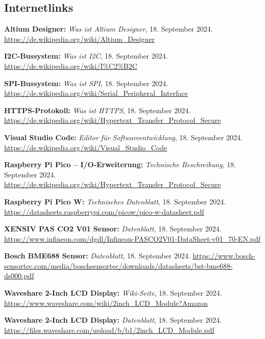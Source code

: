 \begin{thebibliography}{9999}

\section*{Internetlinks}

\textbf{Altium Designer:} \textit{Was ist Altium Designer}, 18. September 2024.  
\url{https://de.wikipedia.org/wiki/Altium_Designer}

\textbf{I2C-Bussystem:} \textit{Was ist I2C}, 18. September 2024.  
\url{https://de.wikipedia.org/wiki/I%C2%B2C}

\textbf{SPI-Bussystem:} \textit{Was ist SPI}, 18. September 2024.  
\url{https://de.wikipedia.org/wiki/Serial_Peripheral_Interface}

\textbf{HTTPS-Protokoll:} \textit{Was ist HTTPS}, 18. September 2024.  
\url{https://de.wikipedia.org/wiki/Hypertext_Transfer_Protocol_Secure}

\textbf{Visual Studio Code:} \textit{Editor für Softwareentwicklung}, 18. September 2024.  
\url{https://de.wikipedia.org/wiki/Visual_Studio_Code}

\textbf{Raspberry Pi Pico – I/O-Erweiterung:} \textit{Technische Beschreibung}, 18. September 2024.  
\url{https://de.wikipedia.org/wiki/Hypertext_Transfer_Protocol_Secure}

\textbf{Raspberry Pi Pico W:} \textit{Technisches Datenblatt}, 18. September 2024.  
\url{https://datasheets.raspberrypi.com/picow/pico-w-datasheet.pdf}

\textbf{XENSIV PAS CO2 V01 Sensor:} \textit{Datenblatt}, 18. September 2024.  
\url{https://www.infineon.com/dgdl/Infineon-PASCO2V01-DataSheet-v01_70-EN.pdf}

\textbf{Bosch BME688 Sensor:} \textit{Datenblatt}, 18. September 2024.  
\url{https://www.bosch-sensortec.com/media/boschsensortec/downloads/datasheets/bst-bme688-ds000.pdf}

\textbf{Waveshare 2-Inch LCD Display:} \textit{Wiki-Seite}, 18. September 2024.  
\url{https://www.waveshare.com/wiki/2inch_LCD_Module?Amazon}

\textbf{Waveshare 2-Inch LCD Display:} \textit{Datenblatt}, 18. September 2024.  
\url{https://files.waveshare.com/upload/b/b1/2inch_LCD_Module.pdf}


\end{thebibliography}
